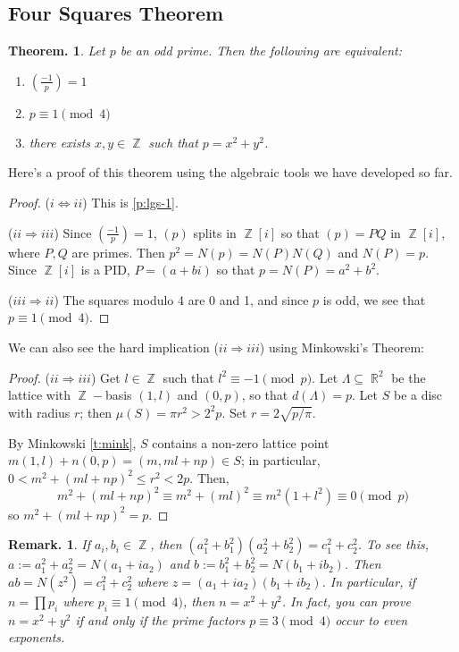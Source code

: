 \documentclass[11pt, a4paper]{memoir}
\DeclareMathOperator{\Z}{{\mathbb{Z}}}
\DeclareMathOperator{\R}{{\mathbb{R}}}
\newcommand{\impendc}{\hspace{0.3cm}}
\newcommand{\iimp}[2]{($#1\Rightarrow#2$)}
\newcommand{\iimpe}[2]{($#1\Leftrightarrow#2$)}
\newcommand{\imp}[2]{\iimp{#1}{#2}\impendc}
\newcommand{\impe}[2]{\iimpe{#1}{#2}\impendc}
\theoremstyle{change}
\newtheorem{theorem}{Theorem.}[section]
\theoremstyle{plain}
\theoremstyle{nonumberplain}
\newtheorem{remark}{Remark.}
\newtheorem{proof}{Proof}
\newcommand{\lgs}[2]{\ensuremath{\left(\frac{#1}{#2}\right)}}
\numberwithin{equation}{section}
\begin{document}
\subsection{Four Squares Theorem}
\begin{theorem}
    Let $p$ be an odd prime.
    Then the following are equivalent:
    \begin{enumerate}[nl,r]
        \item $\lgs{-1}{p}=1$
        \item $p\equiv 1\pmod{4}$
        \item there exists $x,y\in\Z$ such that $p=x^2+y^2$.
    \end{enumerate}
\end{theorem}
Here's a proof of this theorem using the algebraic tools we have developed so far.
\begin{proof}
    \impe{i}{ii}
    This is \cref{p:lgs-1}.

    \imp{ii}{iii}
    Since $\lgs{-1}{p}=1$, $(p)$ splits in $\Z[i]$ so that $(p)=PQ$ in $\Z[i]$, where $P,Q$ are primes.
    Then $p^2=N(p)=N(P)N(Q)$ and $N(P)=p$.
    Since $\Z[i]$ is a PID, $P=(a+bi)$ so that $p=N(P)=a^2+b^2$.

    \imp{iii}{ii}
    The squares modulo 4 are 0 and 1, and since $p$ is odd, we see that $p\equiv 1\pmod{4}$.
\end{proof}
We can also see the hard implication \iimp{ii}{iii} using Minkowski's Theorem:
\begin{proof}
    \imp{ii}{iii}
    Get $l\in\Z$ such that $l^2\equiv -1\pmod{p}$.
    Let $\Lambda\subseteq\R^2$ be the lattice with $\Z-$basis $(1,l)$ and $(0,p)$, so that $d(\Lambda)=p$.
    Let $S$ be a disc with radius $r$; then $\mu(S)=\pi r^2> 2^2p$.
    Set $r=2\sqrt{p/\pi}$.

    By Minkowski \cref{t:mink}, $S$ contains a non-zero lattice point $m(1,l)+n(0,p)=(m,ml+np)\in S$; in particular, $0<m^2+(ml+np)^2\leq r^2<2p$.
    Then,
    \begin{equation*}
        m^2+(ml+np)^2\equiv m^2+(ml)^2\equiv m^2(1+l^2)\equiv 0\pmod{p}
    \end{equation*}
    so $m^2+(ml+np)^2=p$.
\end{proof}
\begin{remark}
    If $a_i,b_i\in\Z$, then $(a_1^2+b_1^2)(a_2^2+b_2^2)=c_1^2+c_2^2$.
    To see this, $a:=a_1^2+a_2^2=N(a_1+ia_2)$ and $b:=b_1^2+b_2^2=N(b_1+ib_2)$.
    Then $ab=N(z^2)=c_1^2+c_2^2$ where $z=(a_1+ia_2)(b_1+ib_2)$.
    In particular, if $n=\prod p_i$ where $p_i\equiv 1\pmod{4}$, then $n=x^2+y^2$.
    In fact, you can prove $n=x^2+y^2$ if and only if the prime factors $p\equiv 3\pmod{4}$ occur to even exponents.
\end{remark}
\end{document}
